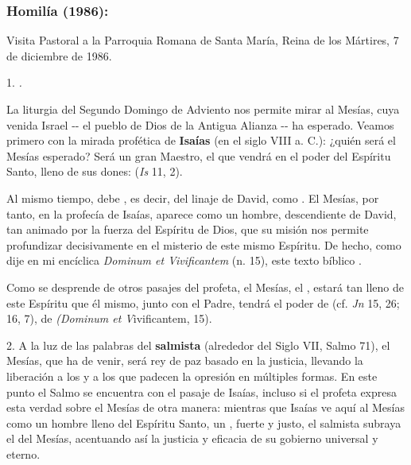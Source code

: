 \begin{body}
	\subsubsection{Homilía (1986): }
	
	Visita Pastoral a la Parroquia Romana de Santa María, Reina de los Mártires, 7 de diciembre de 1986.
	
	\begin{body}
		1. \emph{.}
		
		La liturgia del Segundo Domingo de Adviento nos permite mirar al Mesías, cuya venida Israel -\/- el pueblo de Dios de la Antigua Alianza -\/- ha esperado. Veamos primero con la mirada profética de \textbf{Isaías} (en el siglo VIII a. C.): ¿quién será el Mesías esperado? Será un gran Maestro, el que vendrá en el poder del Espíritu Santo, lleno de sus dones:  (\emph{Is} 11, 2).
		
		Al mismo tiempo, debe , es decir, del linaje de David, como . El Mesías, por tanto, en la profecía de Isaías, aparece como un hombre, descendiente de David, tan animado por la fuerza del Espíritu de Dios, que su misión nos permite profundizar decisivamente en el misterio de este mismo Espíritu. De hecho, como dije en mi encíclica \emph{Dominum et Vivificantem} (n. 15), este texto bíblico .
		
		Como se desprende de otros pasajes del profeta, el Mesías, el , estará tan lleno de este Espíritu que él mismo, junto con el Padre, tendrá el poder de  (cf. \emph{Jn} 15, 26; 16, 7), de  \emph{(Dominum et V}ivificantem, 15).
		
		2. A la luz de las palabras del \textbf{salmista} (alrededor del Siglo VII, Salmo 71), el Mesías, que ha de venir, será rey de paz basado en la justicia, llevando la liberación a los  y a los que padecen la opresión en múltiples formas. En este punto el Salmo se encuentra con el pasaje de Isaías, incluso si el profeta expresa esta verdad sobre el Mesías de otra manera: mientras que Isaías ve aquí al Mesías como un hombre lleno del Espíritu Santo, un , fuerte y justo, el salmista subraya el  del Mesías, acentuando así la justicia y eficacia de su gobierno universal y eterno.
		

\end{body}
\end{body}
